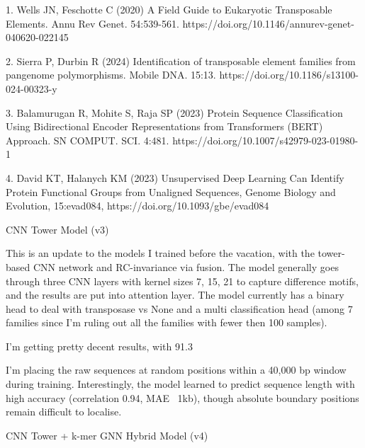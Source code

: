 \documentclass[12pt]{article}
\begin{document}
1. Wells JN, Feschotte C (2020) A Field Guide to Eukaryotic Transposable Elements. Annu Rev Genet. 54:539-561. https://doi.org/10.1146/annurev-genet-040620-022145 

2. Sierra P, Durbin R (2024) Identification of transposable element families from pangenome polymorphisms. Mobile DNA. 15:13. https://doi.org/10.1186/s13100-024-00323-y 

3. Balamurugan R, Mohite S, Raja SP (2023) Protein Sequence Classification Using Bidirectional Encoder Representations from Transformers (BERT) Approach. SN COMPUT. SCI. 4:481. https://doi.org/10.1007/s42979-023-01980-1 

4. David KT, Halanych KM (2023) Unsupervised Deep Learning Can Identify Protein Functional Groups from Unaligned Sequences, Genome Biology and Evolution, 15:evad084, https://doi.org/10.1093/gbe/evad084 

\fi

\iffalse


CNN Tower Model (v3)

This is an update to the models I trained before the vacation, with the tower-based CNN network and RC-invariance via fusion. The model generally goes through three CNN layers with kernel sizes 7, 15, 21 to capture difference motifs, and the results are put into attention layer. The model currently has a binary head to deal with transposase vs None and a multi classification head (among 7 families since I'm ruling out all the families with fewer then 100 samples). 

I'm getting pretty decent results, with 91.3%

I'm placing the raw sequences at random positions within a 40,000 bp window during training. Interestingly, the model learned to predict sequence length with high accuracy (correlation 0.94, MAE ~1kb), though absolute boundary positions remain difficult to localise.

CNN Tower + k-mer GNN Hybrid Model (v4)
\end{document}
